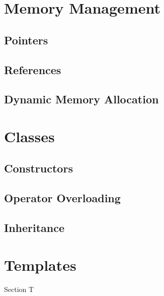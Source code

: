 \documentclass{article}
\begin{document}
\section{Memory Management}
  \subsection{Pointers}
  \subsection{References}
  \subsection{Dynamic Memory Allocation} 


\section{Classes}
  \subsection{Constructors}
  \subsection{Operator Overloading}
  \subsection{Inheritance}

\section{Templates}
  Section T
\end{document}
